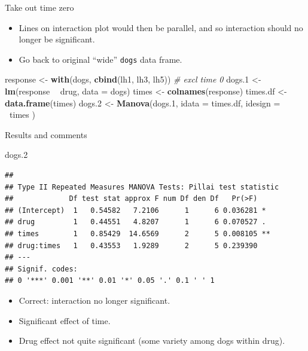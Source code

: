 \documentclass[ignorenonframetext,]{beamer}
\newenvironment{Shaded}{\begin{snugshade}}{\end{snugshade}}
\newcommand{\CommentTok}[1]{\textcolor[rgb]{0.56,0.35,0.01}{\textit{#1}}}
\newcommand{\DataTypeTok}[1]{\textcolor[rgb]{0.13,0.29,0.53}{#1}}
\newcommand{\FloatTok}[1]{\textcolor[rgb]{0.00,0.00,0.81}{#1}}
\newcommand{\KeywordTok}[1]{\textcolor[rgb]{0.13,0.29,0.53}{\textbf{#1}}}
\newcommand{\NormalTok}[1]{#1}
\newcommand{\OperatorTok}[1]{\textcolor[rgb]{0.81,0.36,0.00}{\textbf{#1}}}
\newcommand{\StringTok}[1]{\textcolor[rgb]{0.31,0.60,0.02}{#1}}
\begin{document}
\begin{frame}[fragile]{Take out time zero}
\protect\hypertarget{take-out-time-zero}{}

\begin{itemize}
\item
  Lines on interaction plot would then be parallel, and so interaction
  should no longer be significant.
\item
  Go back to original ``wide'' \texttt{dogs} data frame.
\end{itemize}

\begin{Shaded}
\begin{Highlighting}[]
\NormalTok{response <-}\StringTok{ }\KeywordTok{with}\NormalTok{(dogs, }\KeywordTok{cbind}\NormalTok{(lh1, lh3, lh5)) }\CommentTok{# excl time 0}
\NormalTok{dogs}\FloatTok{.1}\NormalTok{ <-}\StringTok{ }\KeywordTok{lm}\NormalTok{(response }\OperatorTok{~}\StringTok{ }\NormalTok{drug, }\DataTypeTok{data =}\NormalTok{ dogs)}
\NormalTok{times <-}\StringTok{ }\KeywordTok{colnames}\NormalTok{(response)}
\NormalTok{times.df <-}\StringTok{ }\KeywordTok{data.frame}\NormalTok{(times)}
\NormalTok{dogs}\FloatTok{.2}\NormalTok{ <-}\StringTok{ }\KeywordTok{Manova}\NormalTok{(dogs}\FloatTok{.1}\NormalTok{,}
  \DataTypeTok{idata =}\NormalTok{ times.df,}
  \DataTypeTok{idesign =} \OperatorTok{~}\NormalTok{times}
\NormalTok{)}
\end{Highlighting}
\end{Shaded}

\end{frame}

\begin{frame}[fragile]{Results and comments}
\protect\hypertarget{results-and-comments}{}

\footnotesize

\begin{Shaded}
\begin{Highlighting}[]
\NormalTok{dogs}\FloatTok{.2}
\end{Highlighting}
\end{Shaded}

\begin{verbatim}
## 
## Type II Repeated Measures MANOVA Tests: Pillai test statistic
##             Df test stat approx F num Df den Df   Pr(>F)   
## (Intercept)  1   0.54582   7.2106      1      6 0.036281 * 
## drug         1   0.44551   4.8207      1      6 0.070527 . 
## times        1   0.85429  14.6569      2      5 0.008105 **
## drug:times   1   0.43553   1.9289      2      5 0.239390   
## ---
## Signif. codes:  
## 0 '***' 0.001 '**' 0.01 '*' 0.05 '.' 0.1 ' ' 1
\end{verbatim}

\normalsize

\begin{itemize}
\item
  Correct: interaction no longer significant.
\item
  Significant effect of time.
\item
  Drug effect not quite significant (some variety among dogs within
  drug).
\end{itemize}

\end{frame}
\end{document}
